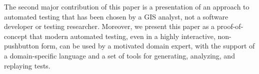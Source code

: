 The second major contribution of this paper is a presentation of an
approach to automated testing that has been chosen by a GIS analyst, not a
software developer or testing researcher.  Moreover, we present this
paper as a proof-of-concept that modern automated testing, even in a
highly interactive, non-pushbutton form, can be used by a motivated
domain expert, with the support of  a domain-specific language and a
set of tools for generating, analyzing, and replaying tests.


